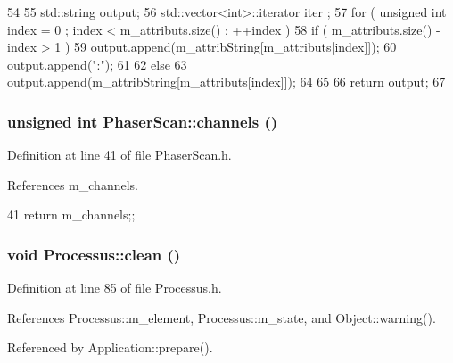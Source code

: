 \begin{DoxyCode}
54                             {
55   std::string output;
56   std::vector<int>::iterator iter ;
57   for ( unsigned int index = 0 ; index < m_attributs.size() ; ++index ) {
58     if ( m_attributs.size() - index > 1 ) {
59       output.append(m_attribString[m_attributs[index]]);
60       output.append(":");
61     }
62     else {
63       output.append(m_attribString[m_attributs[index]]);
64     }
65   }
66   return output;
67 }
\end{DoxyCode}
\hypertarget{classPhaserScan_ae3752906e17afd1f7ee5f62a08711871}{
\subsubsection[{channels}]{\setlength{\rightskip}{0pt plus 5cm}unsigned int PhaserScan::channels ()}}
\label{classPhaserScan_ae3752906e17afd1f7ee5f62a08711871}


Definition at line 41 of file PhaserScan.h.

References m\_\-channels.


\begin{DoxyCode}
41 {return m_channels;};
\end{DoxyCode}
\hypertarget{classProcessus_aaeb17673b98d2b39f3aa780e335e0968}{
\subsubsection[{clean}]{\setlength{\rightskip}{0pt plus 5cm}void Processus::clean ()}}
\label{classProcessus_aaeb17673b98d2b39f3aa780e335e0968}


Definition at line 85 of file Processus.h.

References Processus::m\_\-element, Processus::m\_\-state, and Object::warning().

Referenced by Application::prepare().


